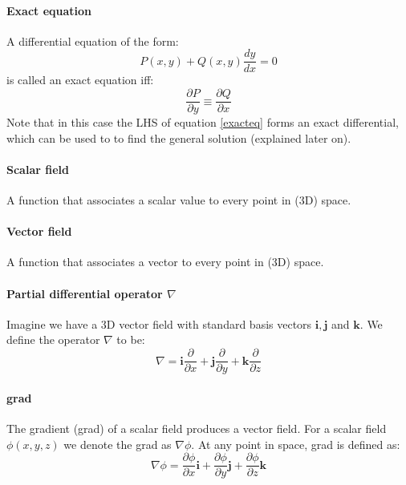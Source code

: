 \documentclass{scrartcl}
\renewcommand{\vec}[1]{\mathbf{#1}}
\begin{document}
\paragraph{Exact equation}
A differential equation of the form:
\begin{equation} \label{exacteq}
P(x, y) + Q(x, y) \frac{dy}{dx} = 0
\end{equation}
is called an exact equation iff:
\begin{equation}
\frac{\partial P}{\partial y} \equiv \frac{\partial Q}{\partial x}
\end{equation}
Note that in this case the LHS of equation \ref{exacteq} forms an exact differential, which can be used to to find the general solution (explained later on).

\paragraph{Scalar field}
A function that associates a scalar value to every point in (3D) space.

\paragraph{Vector field}
A function that associates a vector to every point in (3D) space.

\paragraph{Partial differential operator $ \nabla $}
Imagine we have a 3D vector field with standard basis vectors $ \vec{i}, \vec{j} $ and $ \vec{k}  $. We define the operator $ \nabla $ to be:
\begin{equation}
\nabla = \vec{i} \frac{\partial}{\partial x} + \vec{j} \frac{\partial}{\partial y} + \vec{k} \frac{\partial}{\partial z}
\end{equation}

\paragraph{grad}
The gradient (grad) of a scalar field produces a vector field. For a scalar field $ \phi(x, y, z) $ we denote the grad as $ \nabla \phi $. At any point in space, grad is defined as:
\begin{equation}
\nabla \phi = \frac{\partial \phi}{\partial x} \vec{i} + \frac{\partial \phi}{\partial y} \vec{j} + \frac{\partial \phi}{\partial z} \vec{k}
\end{equation}
\end{document}

